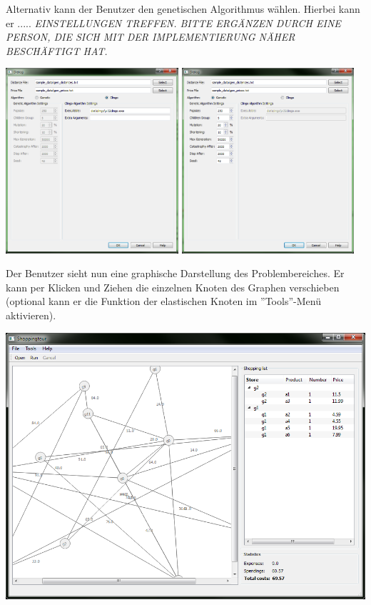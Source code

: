 Alternativ kann der Benutzer den genetischen Algorithmus wählen. Hierbei kann er ..... \emph{EINSTELLUNGEN TREFFEN. BITTE ERGÄNZEN DURCH EINE PERSON, DIE SICH MIT DER IMPLEMENTIERUNG NÄHER BESCHÄFTIGT HAT.}

\includegraphics[width=0.48\textwidth]{resourcen/walkthrough/1a-open-clingo.png} \includegraphics[width=0.48\textwidth]{resourcen/walkthrough/1b-open-genetic.png}

\newpage

Der Benutzer sieht nun eine graphische Darstellung des Problembereiches. Er kann per Klicken und Ziehen die einzelnen Knoten des Graphen verschieben (optional kann er die Funktion der elastischen Knoten im ''Tools''-Menü aktivieren).

\includegraphics[width=1\textwidth]{resourcen/walkthrough/2-opened-clingo.png}

